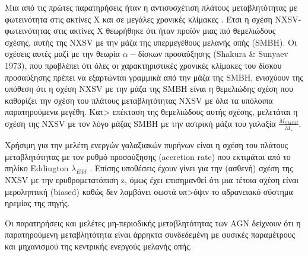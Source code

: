 Μια από τις πρώτες παρατηρήσεις ήταν η αντισυσχέτιση πλάτους μεταβλητότητας με φωτεινότητα στις ακτίνες Χ \cite{1997ApJ...476...70N}\cite{2012A&A...542A..83P} και σε μεγάλες χρονικές κλίμακες \cite{2001ApJ...547..684M}. Έτσι η σχέση \textlatin{NXSV}- φωτεινότητας στις ακτίνες Χ θεωρήθηκε ότι ήταν προϊόν μιας πιό θεμελιώδους σχέσης, αυτής της \textlatin{NXSV} με την μάζα της υπερμεγέθους μελανής οπής \textlatin{(SMBH)}\cite{2004MNRAS.348..207P}. Οι σχέσεις αυτές μαζί με την θεωρία $\alpha-$δίσκων προσαύξησης \textlatin{(Shakura \& Sunyaev 1973)}, που προβλέπει ότι όλες οι χαρακτηριστικές χρονικές κλίμακες του δίσκου προσαύξησης πρέπει να εξαρτώνται γραμμικά από την μάζα της \textlatin{SMBH,} ενισχύουν της υπόθεση ότι η σχέση \textlatin{NXSV} με την μάζα της \textlatin{SMBH} είναι η θεμελιώδης σχέση που καθορίζει την σχέση του πλάτους μεταβλητότητας \textlatin{NXSV} με όλα τα υπόλοιπα παρατηρούμενα μεγέθη\cite{2012A&A...542A..83P}. Κατ> επέκταση της θεμελιώδους αυτής σχέσης, μελετάται η σχέση της \textlatin{NXSV} με τον λόγο μάζας \textlatin{SMBH} με την αστρική μάζα του γαλαξία $\frac{M_{SMBH}}{M_{\star}}$\cite{VAR}. 

Χρήσιμη για την μελέτη ενεργών γαλαξιακών πυρήνων είναι η σχέση του πλάτους μεταβλητότητας με τον ρυθμό προσαύξησης \textlatin{(accretion rate)} που εκτιμάται από το πηλίκο \textlatin{Eddington} $\lambda_{Edd}$\cite{2012MNRAS.425..623L}\cite{2012A&A...542A..83P} \cite{2017MNRAS.471.4398P}. Επίσης υποθέσεις έχουν γίνει για την (ασθενή) σχέση της \textlatin{NXSV} με την ερυθρομετατόπιση \textlatin{z}\cite{2007A&A...473..105M}, όμως έχει επισημανθεί ότι μια τέτοια σχέση είναι μεροληπτική (\textlatin{biased})\cite{2013ApJ...771....9A}\cite{2008A&A...487..475P} καθώς δεν λαμβάνει σωστά υπ>όψιν το αδρανειακό σύστημα ηρεμίας της πηγής\cite{2008A&A...487..475P}.

Οι παρατηρήσεις και μελέτες μη-περιοδικής μεταβλητότητας των \textlatin{AGN} δείχνουν ότι η παρατηρούμενη μεταβλητότητα είναι άρρηκτα συνδεδεμένη με φυσικές παραμέτρους και μηχανισμού της κεντρικής ενεργούς μελανής οπής\cite{VAR}. 


